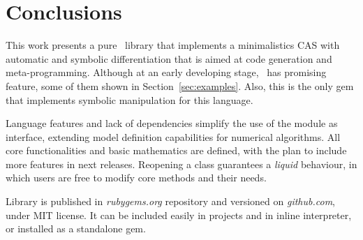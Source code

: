 
\section{Conclusions}
\label{sec:conclusions}

This work presents a pure \Ruby~library that implements a minimalistics CAS with
automatic and symbolic differentiation that is aimed at code generation and meta-programming.
Although at an early developing stage, \ragnicas~has promising feature, some of them
shown in Section~\ref{sec:examples}. Also, this is the only gem that implements
symbolic manipulation for this language.

Language features and lack of dependencies simplify the use of the module as interface, extending model definition
capabilities for numerical algorithms. All core functionalities and basic mathematics are defined, with the plan to include more features in next releases. Reopening a class guarantees a
\emph{liquid} behaviour, in which users are free to modify core methods and their needs.

Library is published in \emph{rubygems.org} repository and versioned on \emph{github.com}, under MIT license.
It can be included easily in projects and in inline interpreter, or installed as a standalone gem.
